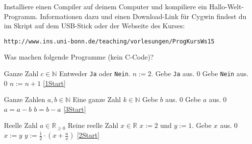 \documentclass{../uebungszettel}
\begin{document}
\begin{aufg}
Installiere einen Compiler auf deinem Computer und kompiliere ein Hallo-Welt-Programm. Informationen dazu und einen Download-Link für Cygwin findest du im Skript auf dem USB-Stick oder der Webseite des Kurses:
\begin{center}
	\verb|http://www.ins.uni-bonn.de/teaching/vorlesungen/ProgKursWs15 |
\end{center}
\end{aufg}



\begin{aufg}
Was machen folgende Programme (kein C-Code)?

\begin{algorithm}[H]
\caption{}
\begin{algorithmic}[1]
\REQUIRE Ganze Zahl $c\in\mathbb{N}$
\ENSURE Entweder \verb|Ja| oder \verb|Nein|.
\STATE \SET $n := 2$.
 \label{1Start}
\STATE Gebe \verb|Ja| aus.
\RETURN $0$
\ENDIF
{}
\STATE Gebe \verb|Nein| aus.
\RETURN $0$
\ENDIF
\STATE \SET $n := n + 1$
\STATE \GOTO \ref{1Start}
\end{algorithmic}
\end{algorithm}

\begin{algorithm}[H]
\caption{}
\begin{algorithmic}[1]
\REQUIRE Ganze Zahlen $a,b\in\mathbb{N}$
\ENSURE Eine ganze Zahl $k\in\mathbb{N}$
\STATE Gebe $b$ aus.
\RETURN $0$
\ENDIF
{} \label{3Start}
\STATE Gebe $a$ aus.
\RETURN $0$
\ENDIF
{}
\STATE \SET $a = a - b$
\ELSE 
\STATE \SET $b = b - a$
\ENDIF
\STATE \GOTO \ref{3Start}
\end{algorithmic}
\end{algorithm}

\begin{algorithm}[H]
\caption{}
\begin{algorithmic}[1]
\REQUIRE Reelle Zahl $a\in\mathbb{R}_{\ge 0}$
\ENSURE Reine reelle Zahl $x\in\mathbb{R}$
\STATE \SET $x := 2$ und $y := 1$.
 \label{2Start} 
\STATE Gebe $x$ aus.
\RETURN $0$
\ENDIF
\STATE \SET $x := y$
\STATE \SET $y := \frac{1}{2} \cdot \left(x+\frac{a}{x}\right)$
\STATE \GOTO \ref{2Start}
\end{algorithmic}
\end{algorithm}
\end{aufg}
\end{document}
